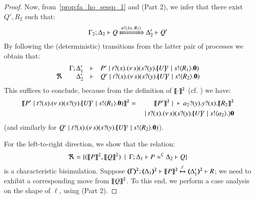 \begin{proof}
		{}
		{}
		{\fwb}
		{}
		{}
		{}

	\noi Now, from~\eqref{prop:fa_ho_sessp_1} and   (Part 2), we infer that
	there exist $Q', R_2$ such that:
%
	\begin{eqnarray*}
		\Gamma_2; \Delta_2 \proves Q \Hby{\bactout{n}{\abs{x}{R_2}}} \Delta_2' \proves Q'
	\end{eqnarray*}
%
	By following the (deterministic) transitions from the latter pair of processes we obtain that:
%	
%
	$$
	\mhorel	{\Gamma}
		{\Delta_1'}
		{P' \Par \binp{t}{x} \newsp{s}{ \binp{s}{y} \mapchar{U}{y} \Par \bout{s}{R_1} \inact }}
		{\Re}
		{\Delta_2'}
		{}
		{Q' \Par \binp{t}{x} \newsp{s}{ \binp{s}{y} \mapchar{U}{y} \Par \bout{s}{R_2} \inact } }
	$$
	This suffices to conclude, because from the definition of $\llbracket\cdot\rrbracket^\mathtt{2}$ (cf. ) we have:
	\begin{eqnarray*}
		\pmap{P' \Par \binp{t}{x} \newsp{s}{ \binp{s}{y} \mapchar{U}{y} \Par \bout{s}{R_1} \inact}}{2}  & = &
		\pmap{P'}{2} \Par \repl{\binp{a_2}{y} \binp{y}{x} \pmap{R_2}{2}} \\ & & \Par \binp{t}{x} \newsp{s}{ \binp{s}{y} \mapchar{U}{y} \Par \bout{s}{a_2}} \inact
	\end{eqnarray*}
	(and similarly for $Q' \;|\; t ? (x) . (\nu\, s)( s ? (y) . [\!\!(U)\!\!]^{y} \;|\; s ! \langle R_2 \rangle . \mathbf{0} ) $).

\bigskip

	\noi For the left-to-right direction, we show that the relation:
	\[
		\Re = \{ 
		(\llbracket P\rrbracket^\mathtt{2}, \llbracket Q\rrbracket^\mathtt{2})
		\ \ |\ \  \Gamma; \Delta_1 \vdash P \approx^\mathtt{C} \Delta_2 \vdash Q\}
	\]
%
	 is a characteristic bisimulation.
Suppose %
$\stytra{\tmap{\Gamma}{2}}{\ell}{\tmap{\Delta_1}{2}}{\pmap{P}{2}}{\tmap{\Delta_1'}{2}}{R}$;
we need to exhibit a corresponding move from $\llbracket Q\rrbracket^\mathtt{2}$.
To this end, we perform a case analysis on the shape of ${\ell}$, using 
 (Part 2).


\end{proof}
